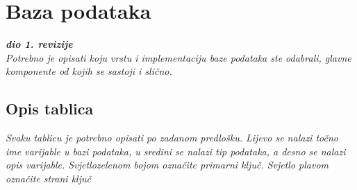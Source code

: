 	
		

		

				
		\section{Baza podataka}
			
			\textbf{\textit{dio 1. revizije}}\\
			
		\textit{Potrebno je opisati koju vrstu i implementaciju baze podataka ste odabrali, glavne komponente od kojih se sastoji i slično.}
		
			\subsection{Opis tablica}
			

				\textit{Svaku tablicu je potrebno opisati po zadanom predlošku. Lijevo se nalazi točno ime varijable u bazi podataka, u sredini se nalazi tip podataka, a desno se nalazi opis varijable. Svjetlozelenom bojom označite primarni ključ. Svjetlo plavom označite strani ključ}
				
